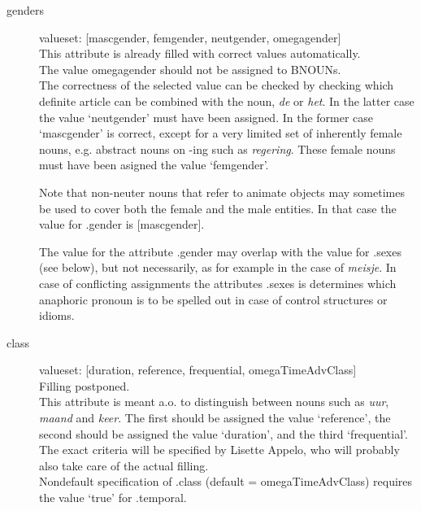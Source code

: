 \begin{description}
\newpage
\item 
[genders]\mbox{}

valueset: [mascgender, femgender, neutgender, omegagender]\\

This attribute is already filled with correct values automatically.\\

The value omegagender should not be assigned to BNOUNs.\\

The correctness of the selected value can be checked by 
 checking
which definite article can be combined with the noun, {\em de} or {\em het}.
In the latter case the value `neutgender' must have been assigned.
In the former case `mascgender' is correct, except for a very limited set of
inherently female nouns, e.g. abstract nouns on -ing such as {\em regering}.
These female nouns must have been asigned the value `femgender'.

Note that non-neuter 
nouns that refer to animate objects may sometimes be used to
cover both the female and the male entities. In that case
the value for .gender is [mascgender]. 

The value for the attribute .gender may overlap with the value for .sexes
(see below), but not necessarily, as for example in the case of {\em meisje}.
In case of conflicting assignments the attributes .sexes is determines
which anaphoric pronoun is to be spelled out in case of control structures or 
idioms. 

\newpage
\item 
[class]\mbox{}

valueset: [duration, reference, frequential, omegaTimeAdvClass]\\

Filling postponed.\\

This attribute is meant a.o. to distinguish between nouns such as
{\em uur}, {\em maand} and {\em keer}.
The first should be assigned the value `reference', the second should be 
assigned the value `duration', and the third `frequential'.\\

The exact criteria will be specified by Lisette Appelo, who will probably also
take care of the actual filling. \\
Nondefault specification of .class (default = omegaTimeAdvClass) 
requires the value `true' for .temporal.




\end{description}
